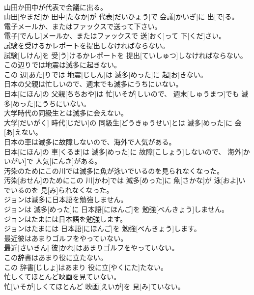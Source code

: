 \documentclass[8pt]{extreport}
\begin{document}
\begin{CJK}{UTF8}{min}
\\	山田か田中が代表で会議に出る。	
\\	山田[やまだ]か 田中[たなか]が 代表[だいひょう]で 会議[かいぎ]に 出[で]る。
\\	電子メールか、またはファックスで送って下さい。	
\\	電子[でんし]メールか、またはファックスで 送[おく]って 下[くだ]さい。
\\	試験を受けるかレポートを提出しなければならない。	
\\	試験[しけん]を 受[う]けるかレポートを 提出[ていしゅつ]しなければならない。
\\	この辺りでは地震は滅多に起きない。	
\\	この 辺[あた]りでは 地震[じしん]は 滅多[めった]に 起[お]きない。
\\	日本の父親は忙しいので、週末でも滅多にうちにいない。	
\\	日本[にほん]の 父親[ちちおや]は 忙[いそが]しいので、 週末[しゅうまつ]でも 滅多[めった]にうちにいない。
\\	大学時代の同級生とは滅多に会えない。	
\\	大学[だいがく] 時代[じだい]の 同級生[どうきゅうせい]とは 滅多[めった]に 会[あ]えない。
\\	日本の車は滅多に故障しないので、海外で人気がある。	
\\	日本[にほん]の 車[くるま]は 滅多[めった]に 故障[こしょう]しないので、 海外[かいがい]で 人気[にんき]がある。
\\	汚染のためにこの川では滅多に魚が泳いでいるのを見られなくなった。	
\\	汚染[おせん]のためにこの 川[かわ]では 滅多[めった]に 魚[さかな]が 泳[およ]いでいるのを 見[み]られなくなった。
\\	ジョンは滅多に日本語を勉強しません。	
\\	ジョンは 滅多[めった]に 日本語[にほんご]を 勉強[べんきょう]しません。
\\	ジョンはたまには日本語を勉強します。	
\\	ジョンはたまには 日本語[にほんご]を 勉強[べんきょう]します。
\\	最近彼はあまりゴルフをやっていない。	
\\	最近[さいきん] 彼[かれ]はあまりゴルフをやっていない。
\\	この辞書はあまり役に立たない。	
\\	この 辞書[じしょ]はあまり 役に立[やくにた]たない。
\\	忙しくてほとんど映画を見ていない。	
\\	忙[いそが]しくてほとんど 映画[えいが]を 見[み]ていない。

\end{CJK}
\end{document}
